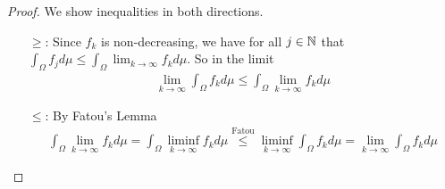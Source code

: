 \begin{proof}
We show inequalities in both directions.
\begin{itemize}
  \item[$\geq$:] Since $f_k$ is non-decreasing, we have for all $j \in \mathbb{N}$ that $\int_{\Omega} f_j d \mu \leq \int_{\Omega} \lim_{k \to \infty} f_kd \mu$. 
    So in the limit
    \begin{align*}
      \lim_{k \to \infty} \int_{\Omega} f_k d \mu \leq \int_{\Omega} \lim_{k \to \infty} f_k d \mu
    \end{align*}

  \item[$\leq$:] By Fatou's Lemma 
    \begin{align*}
      \int_{\Omega} \lim_{k \to \infty}f_k d \mu = \int_{\Omega} \liminf_{k \to \infty}f_k d \mu
      \stackrel{\text{Fatou}}{\leq} \liminf_{k \to \infty} \int_{\Omega} f_k d \mu = \lim_{k \to \infty} \int_{\Omega} f_k d \mu
    \end{align*}
\end{itemize}
\end{proof}



